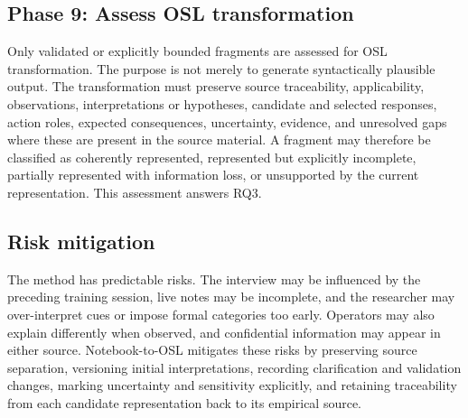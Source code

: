 \subsection{Phase 9: Assess OSL transformation}

Only validated or explicitly bounded fragments are assessed for OSL transformation. The purpose is not merely to generate syntactically plausible output. The transformation must preserve source traceability, applicability, observations, interpretations or hypotheses, candidate and selected responses, action roles, expected consequences, uncertainty, evidence, and unresolved gaps where these are present in the source material. A fragment may therefore be classified as coherently represented, represented but explicitly incomplete, partially represented with information loss, or unsupported by the current representation. This assessment answers RQ3.

\subsection{Risk mitigation}

The method has predictable risks. The interview may be influenced by the preceding training session, live notes may be incomplete, and the researcher may over-interpret cues or impose formal categories too early. Operators may also explain differently when observed, and confidential information may appear in either source. Notebook-to-OSL mitigates these risks by preserving source separation, versioning initial interpretations, recording clarification and validation changes, marking uncertainty and sensitivity explicitly, and retaining traceability from each candidate representation back to its empirical source.
